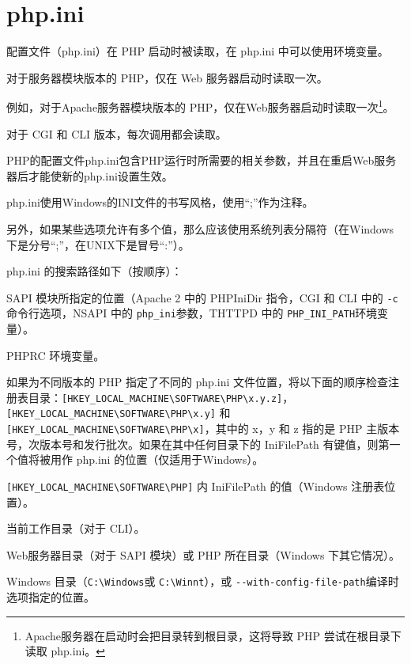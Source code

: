 \section{php.ini}


配置文件（php.ini）在 PHP 启动时被读取，在 php.ini 中可以使用环境变量。

\begin{compactitem}
\item 对于服务器模块版本的 PHP，仅在 Web 服务器启动时读取一次。

例如，对于Apache服务器模块版本的 PHP，仅在Web服务器启动时读取一次\footnote{Apache服务器在启动时会把目录转到根目录，这将导致 PHP 尝试在根目录下读取 php.ini。}。
\item 对于 CGI 和 CLI 版本，每次调用都会读取。
\end{compactitem}


PHP的配置文件php.ini包含PHP运行时所需要的相关参数，并且在重启Web服务器后才能使新的php.ini设置生效。


php.ini使用Windows的INI文件的书写风格，使用“;”作为注释。

另外，如果某些选项允许有多个值，那么应该使用系统列表分隔符（在Windows下是分号“;”，在UNIX下是冒号“:”）。



php.ini 的搜索路径如下（按顺序）：

\begin{compactitem}
\item SAPI 模块所指定的位置（Apache 2 中的 PHPIniDir 指令，CGI 和 CLI 中的 \texttt{-c} 命令行选项，NSAPI 中的 \texttt{php\_ini}参数，THTTPD 中的 \texttt{PHP\_INI\_PATH}环境变量）。
\item PHPRC 环境变量。
\item 如果为不同版本的 PHP 指定了不同的 php.ini 文件位置，将以下面的顺序检查注册表目录：\texttt{[HKEY\_LOCAL\_MACHINE{\textbackslash}SOFTWARE{\textbackslash}PHP{\textbackslash}x.y.z]}，\texttt{[HKEY\_LOCAL\_MACHINE{\textbackslash}SOFTWARE{\textbackslash}PHP{\textbackslash}x.y]} 和 \texttt{[HKEY\_LOCAL\_MACHINE{\textbackslash}SOFTWARE{\textbackslash}PHP{\textbackslash}x]}，其中的 x，y 和 z 指的是 PHP 主版本号，次版本号和发行批次。如果在其中任何目录下的 IniFilePath 有键值，则第一个值将被用作 php.ini 的位置（仅适用于Windows）。
\item \texttt{[HKEY\_LOCAL\_MACHINE{\textbackslash}SOFTWARE{\textbackslash}PHP]} 内 IniFilePath 的值（Windows 注册表位置）。
\item 当前工作目录（对于 CLI）。
\item Web服务器目录（对于 SAPI 模块）或 PHP 所在目录（Windows 下其它情况）。
\item Windows 目录（\texttt{C:{\textbackslash}Windows}或 \texttt{C:{\textbackslash}Winnt}），或 \texttt{-\/-with-config-file-path}编译时选项指定的位置。
\end{compactitem}

